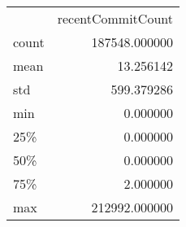 \begin{tabular}{lr}
 & recentCommitCount \\
count & 187548.000000 \\
mean & 13.256142 \\
std & 599.379286 \\
min & 0.000000 \\
25\% & 0.000000 \\
50\% & 0.000000 \\
75\% & 2.000000 \\
max & 212992.000000 \\
\end{tabular}
